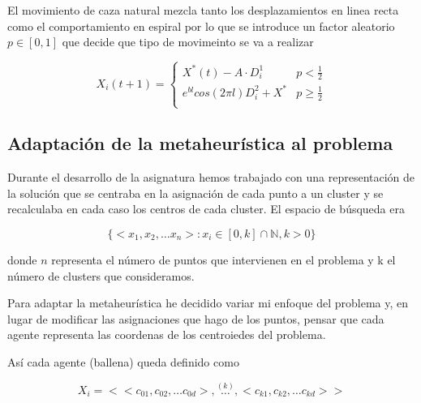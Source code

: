 \documentclass[a4paper,11pt]{article}
\begin{document}
El movimiento de caza natural mezcla tanto los desplazamientos en linea recta
como el comportamiento en espiral por lo que se introduce un factor aleatorio
$p \in [0,1]$ que decide que tipo de movimeinto se va a realizar

\[
    X_i(t+1) =  
\begin{cases}
    X^*(t) - A\cdot D^1_i & p < \frac{1}{2}\\
    e^{bl}cos(2\pi l)D^2_i + X^*  & p\geq \frac{1}{2}\\  
\end{cases}
\]

\subsection{Adaptación de la metaheurística al problema}

Durante el desarrollo de la asignatura hemos trabajado con una representación
de la solución que se centraba en la asignación de cada punto a un cluster
y se recalculaba en cada caso los centros de cada cluster. El espacio de búsqueda 
era 

\[
    \{<x_1, x_2, \dots x_n >: x_i \in [0, k] \cap \mathbb{N}, k > 0\}
\]

donde $n$ representa el número de puntos que intervienen en el problema y k el número 
de clusters que consideramos.

Para adaptar la metaheurística he decidido variar mi enfoque del problema y, en
lugar de modificar las asignaciones que hago de los puntos, pensar que cada
agente representa las coordenas de los centroiedes del problema.

Así cada agente (ballena) queda definido como 

\[
    X_i = <<c_{01},c_{02}, \dots c_{0d}>, \overset{(k)}{\dots}, <c_{k1},c_{k2},\dots c_{kd}>>    
\]
\end{document}
